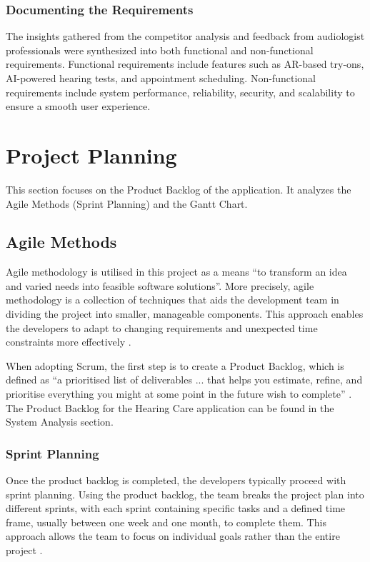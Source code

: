 \documentclass{article}
\begin{document}
\subsubsection{Documenting the Requirements} The insights gathered from the competitor analysis and feedback from audiologist professionals were synthesized into both functional and non-functional requirements. Functional requirements include features such as AR-based try-ons, AI-powered hearing tests, and appointment scheduling. Non-functional requirements include system performance, reliability, security, and scalability to ensure a smooth user experience.



\newpage

\fancyhead[L]{} 

\section{Project Planning}
This section focuses on the Product Backlog of the application. It analyzes the Agile Methods (Sprint Planning) and the Gantt Chart.
\subsection{Agile Methods}
Agile methodology is utilised in this project as a means “to transform an idea and varied needs into feasible software solutions”. More precisely, agile methodology is a collection of techniques that aids the development team in dividing the project into smaller, manageable components. This approach enables the developers to adapt to changing requirements and unexpected time constraints more effectively \cite{sarangam2021agile}.

When adopting Scrum, the first step is to create a Product Backlog, which is defined as “a prioritised list of deliverables ... that helps you estimate, refine, and prioritise everything you might at some point in the future wish to complete” \cite{karlsson_agile_backlogs}. The Product Backlog for the Hearing Care application can be found in the System Analysis section.
\subsubsection{Sprint Planning}
Once the product backlog is completed, the developers typically proceed with sprint planning. Using the product backlog, the team breaks the project plan into different sprints, with each sprint containing specific tasks and a defined time frame, usually between one week and one month, to complete them. This approach allows the team to focus on individual goals rather than the entire project \cite{adobe_workfront_sprints}.
\end{document}
